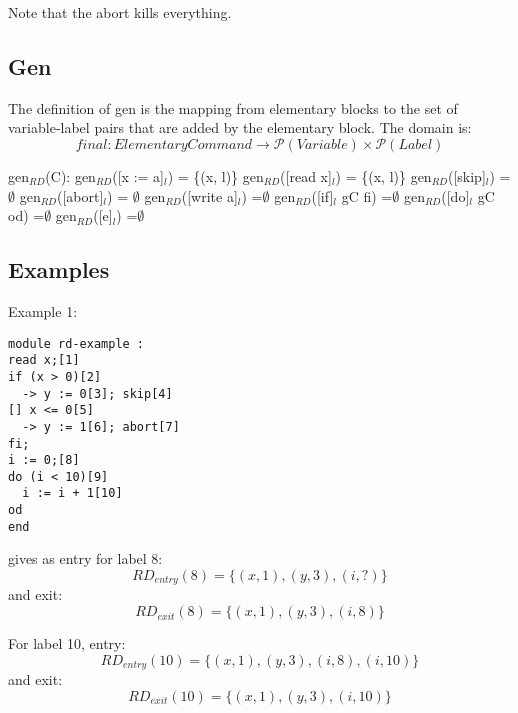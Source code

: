 Note that the abort kills everything.

\subsection{Gen}

The definition of gen is the mapping from elementary blocks to the set of variable-label pairs
that are added by the elementary block. The domain is:
\[final \colon Elementary Command \to \mathcal{P}(Variable)\times\mathcal{P}(Label)\]

gen$_{RD}$(C):\newline
gen$_{RD}$([x := a]$_l$)           = \{(x, l)\}\newline
gen$_{RD}$([read x]$_l$)           = \{(x, l)\}\newline
gen$_{RD}$([skip]$_l$)             =$\emptyset$\newline
gen$_{RD}$([abort]$_l$) 		   = $\emptyset$\newline
gen$_{RD}$([write a]$_l$)          =$\emptyset$\newline
gen$_{RD}$([if]$_l$ gC fi)         =$\emptyset$\newline
gen$_{RD}$([do]$_l$ gC od)         =$\emptyset$\newline
gen$_{RD}$([e]$_l$)                =$\emptyset$\newline

\subsection{Examples}

Example 1:

\begin{lstlisting}
module rd-example :
read x;[1]
if (x > 0)[2]
  -> y := 0[3]; skip[4]
[] x <= 0[5]
  -> y := 1[6]; abort[7]
fi;
i := 0;[8]
do (i < 10)[9]
  i := i + 1[10]
od
end
\end{lstlisting}
gives as entry for label 8:
\[RD_{entry}(8) = \{(x, 1), (y, 3), (i, ?)\}\]
and exit:
\[RD_{exit}(8) = \{(x, 1), (y, 3), (i, 8)\}\]

For label 10, entry:
\[RD_{entry}(10) = \{(x, 1), (y, 3), (i, 8), (i, 10)\}\]
and exit:
\[RD_{exit}(10) = \{(x, 1), (y, 3), (i, 10)\}\]



